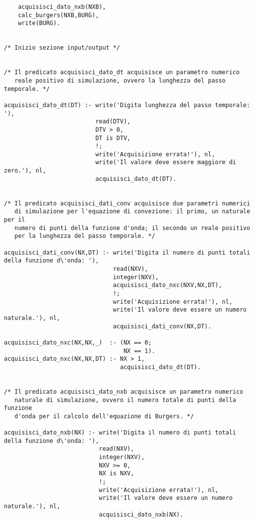 \begin{verbatim}
    acquisisci_dato_nxb(NXB),                                                          
    calc_burgers(NXB,BURG),
    write(BURG).


/* Inizio sezione input/output */
   

/* Il predicato acquisisci_dato_dt acquisisce un parametro numerico
   reale positivo di simulazione, ovvero la lunghezza del passo temporale. */

acquisisci_dato_dt(DT) :- write('Digita lunghezza del passo temporale: '),
                          read(DTV),
                          DTV > 0,
                          DT is DTV,
                          !;     
                          write('Acquisizione errata!'), nl,
                          write('Il valore deve essere maggiore di zero.'), nl,
                          acquisisci_dato_dt(DT).


/* Il predicato acquisisci_dati_conv acquisisce due parametri numerici
   di simulazione per l'equazione di convezione: il primo, un naturale per il 
   numero di punti della funzione d'onda; il secondo un reale positivo 
   per la lunghezza del passo temporale. */

acquisisci_dati_conv(NX,DT) :- write('Digita il numero di punti totali della funzione d\'onda: '),
                               read(NXV),
                               integer(NXV),
                               acquisisci_dato_nxc(NXV,NX,DT),
                               !;     
                               write('Acquisizione errata!'), nl,
                               write('Il valore deve essere un numero naturale.'), nl,
                               acquisisci_dati_conv(NX,DT).

acquisisci_dato_nxc(NX,NX,_)  :- (NX == 0;
                                  NX == 1).
acquisisci_dato_nxc(NX,NX,DT) :- NX > 1,
                                 acquisisci_dato_dt(DT).


/* Il predicato acquisisci_dato_nxb acquisisce un parametro numerico
   naturale di simulazione, ovvero il numero totale di punti della funzione
   d'onda per il calcolo dell'equazione di Burgers. */

acquisisci_dato_nxb(NX) :- write('Digita il numero di punti totali della funzione d\'onda: '),
                           read(NXV),
                           integer(NXV),
                           NXV >= 0,
                           NX is NXV,
                           !;     
                           write('Acquisizione errata!'), nl,
                           write('Il valore deve essere un numero naturale.'), nl,
                           acquisisci_dato_nxb(NX).


\end{verbatim}
